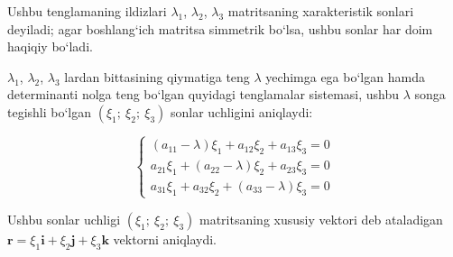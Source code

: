 Ushbu tenglamaning ildizlari $\lambda_1$, $\lambda_2$, $\lambda_3$ matritsaning xarakteristik sonlari deyiladi; agar boshlang`ich matritsa simmetrik bo`lsa, ushbu sonlar har doim haqiqiy bo`ladi.

$\lambda_1$, $\lambda_2$, $\lambda_3$ lardan bittasining qiymatiga teng $\lambda$ yechimga ega bo`lgan  hamda determinanti nolga teng bo`lgan quyidagi tenglamalar sistemasi, ushbu $\lambda$ songa tegishli bo`lgan $(\xi_1;\ \xi_2;\ \xi_3)$ sonlar uchligini aniqlaydi:

	$$
\begin{cases}(a_{11}-\lambda)\xi_1+a_{12}\xi_2+a_{13}\xi_3=0\\
	a_{21}\xi_1+(a_{22}-\lambda)\xi_2+a_{23}\xi_3=0\\
	a_{31}\xi_1+a_{32}\xi_2+(a_{33}-\lambda)\xi_3=0
\end{cases}
	$$

Ushbu sonlar uchligi $(\xi_1;\ \xi_2;\ \xi_3)$ matritsaning xususiy vektori deb ataladigan $\textbf{r}=\xi_1\textbf{i}+\xi_2\textbf{j}+\xi_3\textbf{k}$ vektorni aniqlaydi. 


